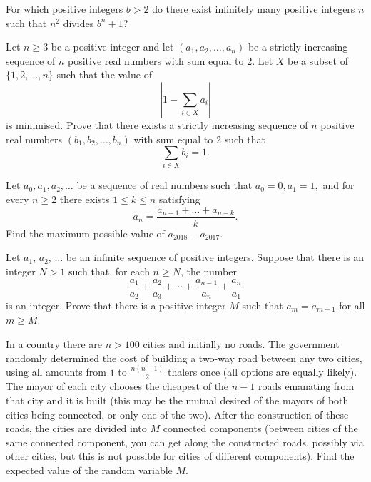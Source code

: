 \documentclass[11pt]{scrartcl}
\begin{document}
\begin{problem}[4679791554410865501]
For which positive integers $b > 2$ do there exist infinitely many positive integers $n$ such that $n^2$ divides $b^n+1$?
\end{problem}
\begin{problem}[290912955085727393]
Let $n \geqslant 3$ be a positive integer and let $\left(a_{1}, a_{2}, \ldots, a_{n}\right)$ be a strictly increasing sequence of $n$ positive real numbers with sum equal to 2. Let $X$ be a subset of $\{1,2, \ldots, n\}$ such that the value of
\[
\left|1-\sum_{i \in X} a_{i}\right|
\]is minimised. Prove that there exists a strictly increasing sequence of $n$ positive real numbers $\left(b_{1}, b_{2}, \ldots, b_{n}\right)$ with sum equal to 2 such that
\[
\sum_{i \in X} b_{i}=1.
\]
\end{problem}
\begin{problem}[3923745101517032298]
	Let $a_0,a_1,a_2,\dots $ be a sequence of real numbers such that $a_0=0, a_1=1,$ and for every $n\geq 2$ there exists $1 \leq k \leq n$ satisfying\[ a_n=\frac{a_{n-1}+\dots + a_{n-k}}{k}. \]Find the maximum possible value of $a_{2018}-a_{2017}$.
\end{problem}
\begin{problem}[402654566950359]
Let $a_1$, $a_2$, $\ldots$ be an infinite sequence of positive integers. Suppose that there is an integer $N > 1$ such that, for each $n \geq N$, the number
$$\frac{a_1}{a_2} + \frac{a_2}{a_3} + \cdots + \frac{a_{n-1}}{a_n} + \frac{a_n}{a_1}$$is an integer. Prove that there is a positive integer $M$ such that $a_m = a_{m+1}$ for all $m \geq M$.
\end{problem}
\begin{problem}[4118541811915047639]
	In a country there are $n>100$ cities and initially no roads. The government randomly determined the cost of building a two-way road between any two cities, using all amounts from $1$ to $\frac{n(n-1)}{2}$ thalers once (all options are equally likely). The mayor of each city chooses the cheapest of the $n-1$ roads emanating from that city and it is built (this may be the mutual desired of the mayors of both cities being connected, or only one of the two).
After the construction of these roads, the cities are divided into $M$ connected components (between cities of the same connected component, you can get along the constructed roads, possibly via other cities, but this is not possible for cities of different components). Find the expected value of the random variable $M$.
\end{problem}
\end{document}
